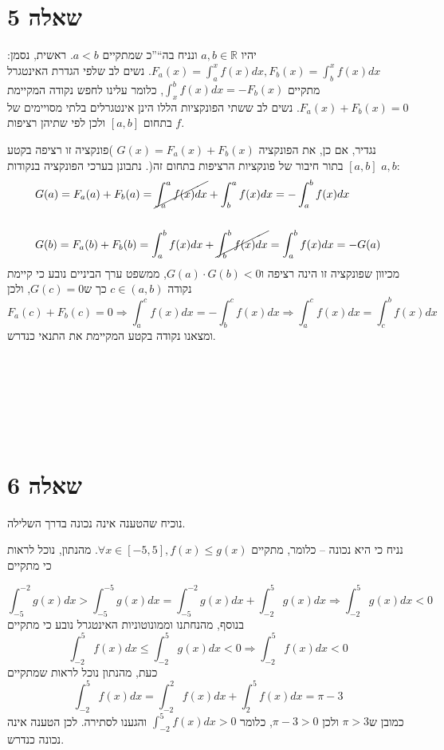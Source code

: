 \documentclass[11pt, oneside]{article}
\newcommand{\qed}{\R{$\blacksquare$}}
\newcommand{\br}{\\\\\\\\\\\\\\}
\newcommand{\logr}[1]{\underset{\text{#1}}{\Longrightarrow}}
\newcommand{\mR}{\mathbb{R}}
\newcommand{\m}[3]{\R{משפט #3#2.#1}}
\newcommand{\defi}[3]{\int_{#1}^{#2} #3}
\begin{document}


\clearpage
\section*{שאלה 5}
יהיו $a, b \in \mR$ ונניח בה``''כ שמתקיים $a < b$. ראשית, נסמן: $F_{a}(x) = \defi{a}{x}{f(x)dx}, F_{b}(x) = \defi{b}{x}{f(x)dx}$. נשים לב שלפי הגדרת האינטגרל מתקיים $\defi{x}{b}{f(x)dx} = -F_{b}(x)$, כלומר עלינו לחפש נקודה המקיימת $F_{a}(x) + F_{b}(x) = 0$. נשים לב ששתי הפונקציות הללו הינן אינטגרלים בלתי מסויימים של $f$ בתחום $[a, b]$ ולכן לפי \m{1}{23}{} שתיהן רציפות.

נגדיר, אם כן, את הפונקציה $G(x) = F_{a}(x) + F_{b}(x)$ )פונקציה זו רציפה בקטע $[a, b]$ בתור חיבור של פונקציות הרציפות בתחום זה(. נתבונן בערכי הפונקציה בנקודות $a, b$:
\begin{align*}
& G(a) = F_{a}(a) + F_{b}(a) = \cancel{\defi{a}{a}{f(x)dx}} + \defi{b}{a}{f(x)dx} = -\defi{a}{b}{f(x)dx}\\\\
& G(b) = F_{a}(b) + F_{b}(b) = \defi{a}{b}{f(x)dx} + \cancel{\defi{b}{b}{f(x)dx}} = \defi{a}{b}{f(x)dx} = -G(a)
\end{align*}
מכיוון שפונקציה זו הינה רציפה ו$G(a) \cdot G(b) < 0$, ממשפט ערך הביניים נובע כי קיימת נקודה $c \in (a, b)$ כך ש$G(c) = 0$, ולכן
\[
F_{a}(c) + F_{b}(c) = 0
\logr{} \defi{a}{c}{f(x)dx} = -\defi{b}{c}{f(x)dx}
\logr{} \defi{a}{c}{f(x)dx} = \defi{c}{b}{f(x)dx}
\]
ומצאנו נקודה בקטע המקיימת את התנאי כנדרש.
\br\qed

\section*{שאלה 6}
נוכיח שהטענה אינה נכונה בדרך השלילה.

נניח כי היא נכונה -- כלומר, מתקיים $\forall x \in [-5, 5], f(x) \le g(x)$. מהנתון, נוכל לראות כי מתקיים

\[
\defi{-5}{-2}{g(x)dx} > \defi{-5}{-5}{g(x)dx} = \defi{-5}{-2}{g(x)dx} + \defi{-2}{5}{g(x)dx}
\logr{}
\defi{-2}{5}{g(x)dx} < 0
\]
בנוסף, מהנחתנו וממונוטוניות האינטגרל נובע כי מתקיים
\[
\defi{-2}{5}{f(x)dx} \le \defi{-2}{5}{g(x)dx} < 0
\logr{}
\defi{-2}{5}{f(x)dx} < 0
\]
כעת, מהנתון נוכל לראות שמתקיים
\[
\defi{-2}{5}{f(x)dx} = \defi{-2}{2}{f(x)dx} + \defi{2}{5}{f(x)dx} = \pi - 3
\]
כמובן ש$\pi > 3$ ולכן $\pi - 3 > 0$, כלומר $\defi{-2}{5}{f(x)dx} > 0$ והגענו לסתירה. לכן הטענה אינה נכונה כנדרש.
\br\qed
\end{document}
